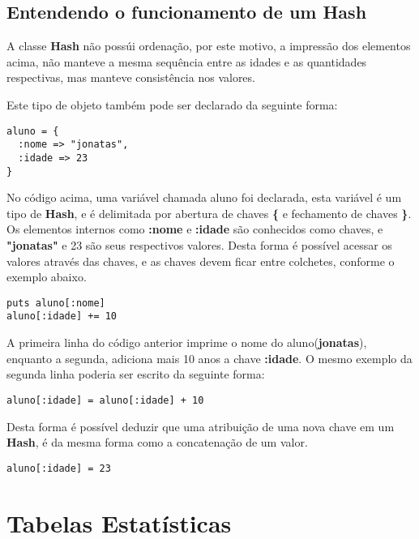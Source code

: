 \documentclass[espaco=simples,appendix=Name]{abnt}
\begin{document}
\subsection { Entendendo o funcionamento de um Hash }

A classe \textbf{Hash} não possúi ordenação, por este motivo, a impressão dos elementos acima, não manteve a mesma sequência entre as idades e as quantidades respectivas, mas manteve consistência nos valores.

Este tipo de objeto também pode ser declarado da seguinte forma:

\begin{lstlisting}[caption=Sintaxe de declaração de um \textbf{Hash}]
aluno = { 
  :nome => "jonatas",
  :idade => 23
}
\end{lstlisting}

No código acima, uma variável chamada aluno foi declarada, esta variável é um tipo de \textbf{Hash}, e é delimitada por abertura de chaves \textbf{\{} e fechamento de chaves \textbf{\}}. Os elementos internos como \textbf{:nome} e \textbf{:idade} são conhecidos como chaves, e \textbf{"jonatas"} e 23 são seus respectivos valores. Desta forma é possível acessar os valores através das chaves, e as chaves devem ficar entre colchetes, conforme o exemplo abaixo. 


\begin{lstlisting}[caption=Usufruindo dos métodos do \textbf{Hash}]
puts aluno[:nome] 
aluno[:idade] += 10
\end{lstlisting}

A primeira linha do código anterior imprime o nome do aluno(\textbf{jonatas}), enquanto a segunda, adiciona mais 10 anos a chave \textbf{:idade}. O mesmo exemplo da segunda linha poderia ser escrito da seguinte forma:

\begin{lstlisting}[caption=Somando 10 anos a chave :idade]
aluno[:idade] = aluno[:idade] + 10
\end{lstlisting}

Desta forma é possível deduzir que uma atribuição de uma nova chave em um \textbf{Hash}, é da mesma forma como a concatenação de um valor.

\begin{lstlisting}[caption=Atribuindo o valor 23 para a chave :idade da variável aluno]
aluno[:idade] = 23 
\end{lstlisting}

\section { Tabelas Estatísticas }
\end{document}
